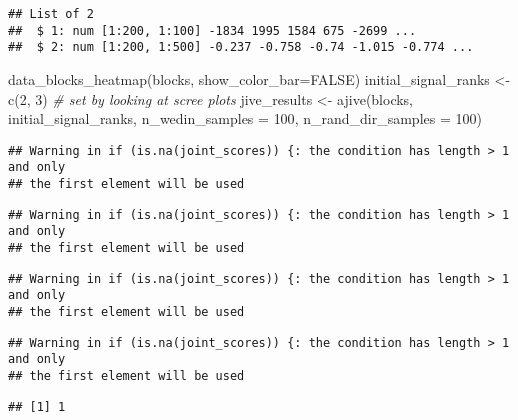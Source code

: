 \documentclass[
]{article}
\newenvironment{Shaded}{\begin{snugshade}}{\end{snugshade}}
\newcommand{\AttributeTok}[1]{\textcolor[rgb]{0.77,0.63,0.00}{#1}}
\newcommand{\CommentTok}[1]{\textcolor[rgb]{0.56,0.35,0.01}{\textit{#1}}}
\newcommand{\ConstantTok}[1]{\textcolor[rgb]{0.00,0.00,0.00}{#1}}
\newcommand{\DecValTok}[1]{\textcolor[rgb]{0.00,0.00,0.81}{#1}}
\newcommand{\FunctionTok}[1]{\textcolor[rgb]{0.00,0.00,0.00}{#1}}
\newcommand{\NormalTok}[1]{#1}
\newcommand{\OtherTok}[1]{\textcolor[rgb]{0.56,0.35,0.01}{#1}}
\newcommand{\SpecialCharTok}[1]{\textcolor[rgb]{0.00,0.00,0.00}{#1}}
\begin{document}
\begin{verbatim}
## List of 2
##  $ 1: num [1:200, 1:100] -1834 1995 1584 675 -2699 ...
##  $ 2: num [1:200, 1:500] -0.237 -0.758 -0.74 -1.015 -0.774 ...
\end{verbatim}

\begin{Shaded}
\begin{Highlighting}[]
\FunctionTok{data\_blocks\_heatmap}\NormalTok{(blocks, }\AttributeTok{show\_color\_bar=}\ConstantTok{FALSE}\NormalTok{)}
\NormalTok{initial\_signal\_ranks }\OtherTok{\textless{}{-}} \FunctionTok{c}\NormalTok{(}\DecValTok{2}\NormalTok{, }\DecValTok{3}\NormalTok{) }\CommentTok{\# set by looking at scree plots}
\NormalTok{jive\_results }\OtherTok{\textless{}{-}} \FunctionTok{ajive}\NormalTok{(blocks, initial\_signal\_ranks, }
                      \AttributeTok{n\_wedin\_samples =} \DecValTok{100}\NormalTok{, }\AttributeTok{n\_rand\_dir\_samples =} \DecValTok{100}\NormalTok{)}
\end{Highlighting}
\end{Shaded}

\begin{verbatim}
## Warning in if (is.na(joint_scores)) {: the condition has length > 1 and only
## the first element will be used
\end{verbatim}

\begin{verbatim}
## Warning in if (is.na(joint_scores)) {: the condition has length > 1 and only
## the first element will be used
\end{verbatim}

\begin{verbatim}
## Warning in if (is.na(joint_scores)) {: the condition has length > 1 and only
## the first element will be used
\end{verbatim}

\begin{verbatim}
## Warning in if (is.na(joint_scores)) {: the condition has length > 1 and only
## the first element will be used
\end{verbatim}

\begin{Shaded}
\end{Shaded}

\begin{verbatim}
## [1] 1
\end{verbatim}
\end{document}
